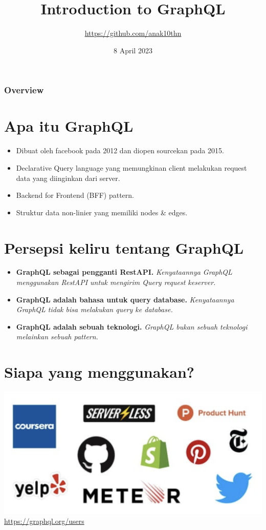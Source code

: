 \documentclass[12pt,xcolor=table]{beamer}
\title{Introduction to GraphQL}
\subtitle{\url{https://github.com/anak10thn}}
\date{8 April 2023}
\begin{document}
\maketitle

\begin{frame}
\frametitle{Overview}
\tableofcontents
\end{frame}

\section{Apa itu GraphQL}

\begin{frame}
\begin{itemize}
    \item Dibuat oleh facebook pada 2012 dan diopen sourcekan pada 2015.
    \item Declarative Query language yang memungkinan client melakukan request data yang diinginkan dari server.
    \item Backend for Frontend (BFF) pattern.
    \item Struktur data non-linier yang memiliki nodes \& edges.
\end{itemize}
\end{frame}

\section{Persepsi keliru tentang GraphQL}

\begin{frame}
\begin{itemize}
    \item \textbf{GraphQL sebagai pengganti RestAPI.} \textit{Kenyataannya GraphQL menggunakan RestAPI untuk mengirim Query request keserver.}
    \item \textbf{GraphQL adalah bahasa untuk query database.} \textit{Kenyataannya GraphQL tidak bisa melakukan query ke database.}
    \item \textbf{GraphQL adalah sebuah teknologi.} \textit{GraphQL bukan sebuah teknologi melainkan sebuah pattern.}
\end{itemize}
\end{frame}

\section{Siapa yang menggunakan?}
\begin{frame}
\includegraphics[scale=0.3]{images/who-use-it.png}
\url{https://graphql.org/users}
\end{frame}
\end{document}
